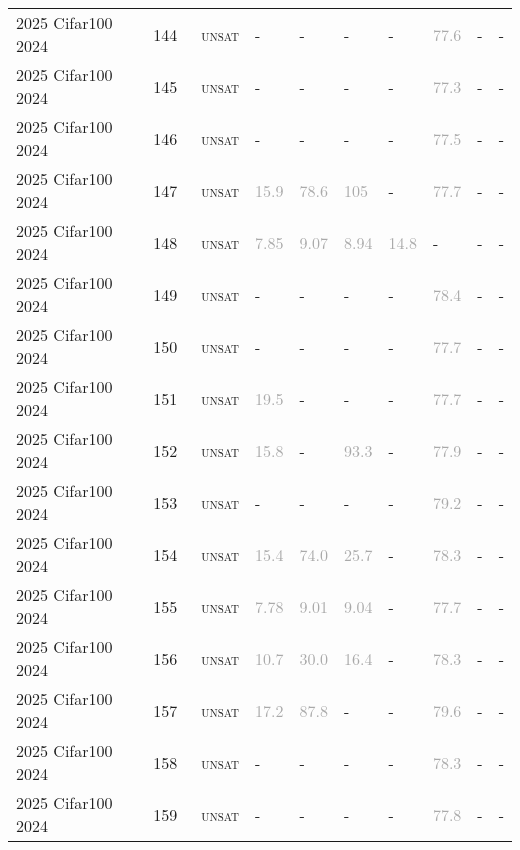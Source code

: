 \begin{center}
{\begin{longtable}{@{}llllllllll@{}}
2025 Cifar100 2024 & 144 & ~\textsc{unsat} & - & - & - & - & \textcolor{darkgray}{77.6} & - & - \\
2025 Cifar100 2024 & 145 & ~\textsc{unsat} & - & - & - & - & \textcolor{darkgray}{77.3} & - & - \\
2025 Cifar100 2024 & 146 & ~\textsc{unsat} & - & - & - & - & \textcolor{darkgray}{77.5} & - & - \\
2025 Cifar100 2024 & 147 & ~\textsc{unsat} & \textcolor{darkgray}{15.9} & \textcolor{darkgray}{78.6} & \textcolor{darkgray}{105} & - & \textcolor{darkgray}{77.7} & - & - \\
2025 Cifar100 2024 & 148 & ~\textsc{unsat} & \textcolor{darkgray}{7.85} & \textcolor{darkgray}{9.07} & \textcolor{darkgray}{8.94} & \textcolor{darkgray}{14.8} & - & - & - \\
2025 Cifar100 2024 & 149 & ~\textsc{unsat} & - & - & - & - & \textcolor{darkgray}{78.4} & - & - \\
2025 Cifar100 2024 & 150 & ~\textsc{unsat} & - & - & - & - & \textcolor{darkgray}{77.7} & - & - \\
2025 Cifar100 2024 & 151 & ~\textsc{unsat} & \textcolor{darkgray}{19.5} & - & - & - & \textcolor{darkgray}{77.7} & - & - \\
2025 Cifar100 2024 & 152 & ~\textsc{unsat} & \textcolor{darkgray}{15.8} & - & \textcolor{darkgray}{93.3} & - & \textcolor{darkgray}{77.9} & - & - \\
2025 Cifar100 2024 & 153 & ~\textsc{unsat} & - & - & - & - & \textcolor{darkgray}{79.2} & - & - \\
2025 Cifar100 2024 & 154 & ~\textsc{unsat} & \textcolor{darkgray}{15.4} & \textcolor{darkgray}{74.0} & \textcolor{darkgray}{25.7} & - & \textcolor{darkgray}{78.3} & - & - \\
2025 Cifar100 2024 & 155 & ~\textsc{unsat} & \textcolor{darkgray}{7.78} & \textcolor{darkgray}{9.01} & \textcolor{darkgray}{9.04} & - & \textcolor{darkgray}{77.7} & - & - \\
2025 Cifar100 2024 & 156 & ~\textsc{unsat} & \textcolor{darkgray}{10.7} & \textcolor{darkgray}{30.0} & \textcolor{darkgray}{16.4} & - & \textcolor{darkgray}{78.3} & - & - \\
2025 Cifar100 2024 & 157 & ~\textsc{unsat} & \textcolor{darkgray}{17.2} & \textcolor{darkgray}{87.8} & - & - & \textcolor{darkgray}{79.6} & - & - \\
2025 Cifar100 2024 & 158 & ~\textsc{unsat} & - & - & - & - & \textcolor{darkgray}{78.3} & - & - \\
2025 Cifar100 2024 & 159 & ~\textsc{unsat} & - & - & - & - & \textcolor{darkgray}{77.8} & - & - \\

\end{longtable}}
\end{center}
